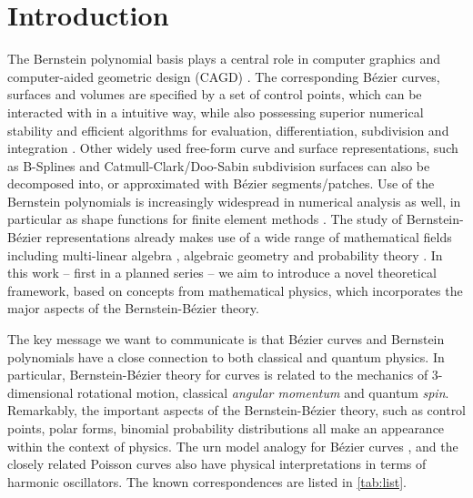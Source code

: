 \documentclass[final,3p,mathptmx]{elsarticle}
\begin{document}
\section{Introduction}\label{sec:1_intro}
The Bernstein polynomial basis plays a central role in computer graphics and computer-aided geometric design (CAGD) \cite{farin2002curves,gallier2000curves}. The corresponding B\'{e}zier curves, surfaces and volumes are specified by a set of control points, which can be interacted with in a intuitive way, while also possessing superior numerical stability \cite{farouki2012bernstein} and efficient algorithms for evaluation, differentiation, subdivision and integration \cite{goldman2002pyramid}. Other widely used free-form curve and surface representations, such as B-Splines and Catmull-Clark/Doo-Sabin subdivision surfaces can also be decomposed into, or approximated with B\'{e}zier segments/patches. Use of the Bernstein polynomials is increasingly widespread in numerical analysis as well, in particular as shape functions for finite element methods \cite{borden2011isogeometric}. The study of Bernstein-B\'{e}zier representations already makes use of a wide range of mathematical fields including multi-linear algebra \cite{ramshaw2001paired}, algebraic geometry \cite{goldman2003topics} and probability theory \cite{goldman1985polya}. In this work -- first in a planned series -- we aim to introduce a novel theoretical framework, based on concepts from mathematical physics, which incorporates the major aspects of the Bernstein-B\'{e}zier theory. 

The key message we want to communicate is that B\'{e}zier curves and Bernstein polynomials have a close connection to both classical and quantum physics. In particular, Bernstein-B\'{e}zier theory for curves is related to the mechanics of 3-dimensional rotational motion, classical \emph{angular momentum} and quantum \emph{spin}. Remarkably, the important aspects of the Bernstein-B\'{e}zier theory, such as control points, polar forms, binomial probability distributions all make an appearance within the context of physics. The urn model analogy for B\'{e}zier curves \cite{goldman1985polya}, and the closely related Poisson curves \cite{morin2000subdivision,morin2002analytic} also have physical interpretations in terms of harmonic oscillators. The known correspondences are listed in \autoref{tab:list}.
\end{document}
